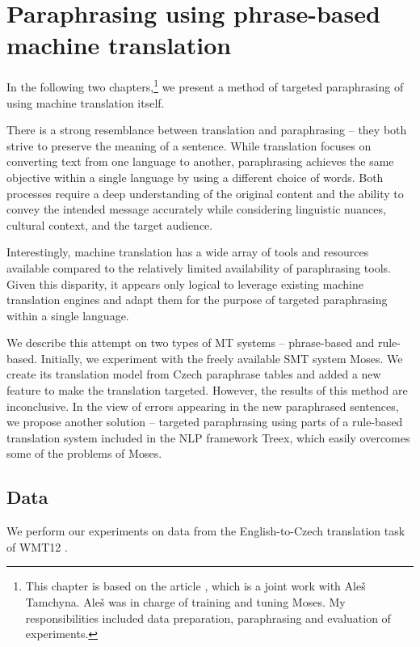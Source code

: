 \chapter{Paraphrasing using phrase-based machine translation}

In the following two chapters,\footnote{This chapter is based on the article \citep{barancikova:itat2014}, which is a joint work with Aleš Tamchyna. 
Aleš was in charge of training and tuning Moses. My responsibilities included data preparation, paraphrasing and evaluation of experiments.} 
we present a method of targeted paraphrasing of using machine translation itself. 

There is a strong resemblance between translation and paraphrasing -- they both strive to preserve the meaning of a sentence.  While translation focuses on converting text from one language to another, paraphrasing achieves the same objective within a single language by using a different choice of words.  %
Both processes require a deep understanding of the original content and the ability to convey the intended message accurately while considering linguistic nuances, cultural context, and the target audience. 

Interestingly, machine translation has a wide array of tools and resources available compared to the relatively limited availability of paraphrasing tools. Given this disparity, it appears only logical to leverage existing machine translation engines and adapt them for the purpose of targeted paraphrasing within a single language.
 
We describe this attempt on two types of MT systems -- phrase-based and rule-based. 
Initially, we experiment with the freely available SMT system Moses.
We create its translation model from  Czech paraphrase tables and added a new feature to make the translation targeted.
However, the results of this method are inconclusive. 
In the view of errors appearing in the new paraphrased sentences, we propose another solution -- targeted paraphrasing using parts of a rule-based translation system included in the NLP framework Treex, which easily overcomes some of the problems of Moses. 


\section{Data} 
We perform our experiments on data from the English-to-Czech translation task 
of WMT12 \cite{wmt12}. 

